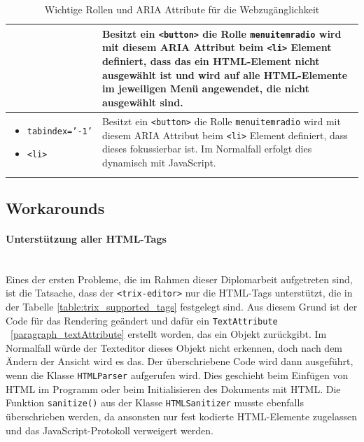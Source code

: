 \begin{longtable}{| p{} | p{} |}
	& Besitzt ein \texttt{<button>} die Rolle \texttt{menuitemradio} wird mit diesem ARIA Attribut beim \texttt{<li>} 
		Element definiert, dass das ein HTML-Element nicht ausgewählt ist und wird auf alle HTML-Elemente im 
		jeweiligen Menü angewendet, die nicht ausgewählt sind.\\
	\hline
	\begin{itemize}[label={}, leftmargin=*]
		\item \texttt{tabindex='-1'} 
		\item \texttt{<li>}
	\end{itemize}
	& Besitzt ein \texttt{<button>} die Rolle \texttt{menuitemradio} wird mit diesem ARIA Attribut beim \texttt{<li>} 
		Element definiert, dass dieses fokussierbar ist. Im Normalfall erfolgt dies dynamisch mit JavaScript.\\
	\hline
	\caption{Wichtige Rollen und ARIA Attribute für die Webzugänglichkeit}
\end{longtable}

\subsection{Workarounds}

\paragraph{Unterstützung aller HTML-Tags}
\mbox{}\\
Eines der ersten Probleme, die im Rahmen dieser Diplomarbeit aufgetreten sind, ist die Tatsache, dass der 
\texttt{<trix-editor>} nur die HTML-Tags unterstützt, die in der Tabelle \ref{table:trix_supported_tags} festgelegt sind. 
Aus diesem Grund ist der Code für das Rendering geändert und dafür ein \texttt{TextAttribute}
~\ref{paragraph_textAttribute} erstellt worden, das ein Objekt zurückgibt. Im Normalfall würde der Texteditor dieses 
Objekt nicht erkennen, doch nach dem Ändern der Ansicht wird es das. Der überschriebene Code wird dann 
ausgeführt, wenn die Klasse \texttt{HTMLParser} aufgerufen wird. Dies geschieht beim Einfügen von HTML im 
Programm oder beim Initialisieren des Dokuments mit HTML. Die Funktion \texttt{sanitize()} aus der Klasse 
\texttt{HTMLSanitizer} musste ebenfalls überschrieben werden, da ansonsten nur fest kodierte HTML-Elemente 
zugelassen und das JavaScript-Protokoll verweigert werden.


